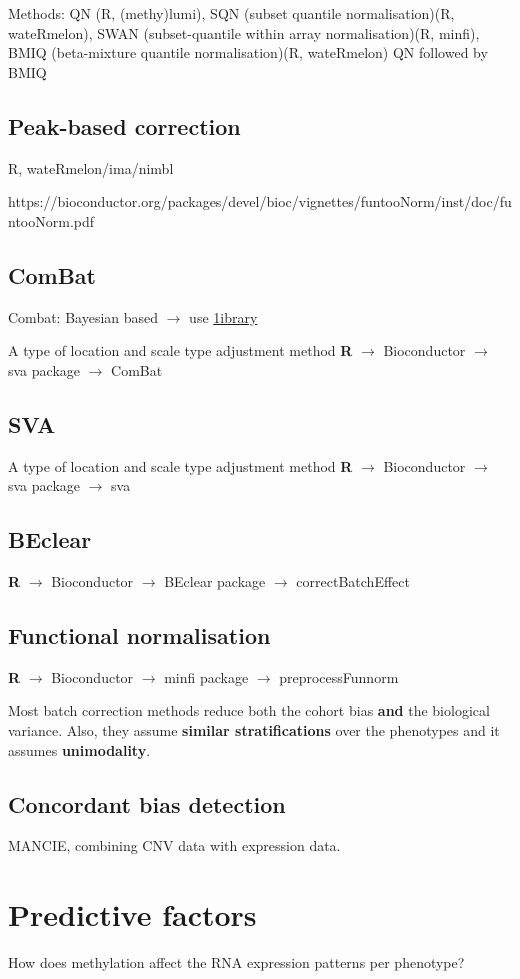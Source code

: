 \documentclass[a4paper,10pt]{article}
\begin{document}
Methods: 
QN  (R, (methy)lumi), 
SQN (subset quantile normalisation)(R, wateRmelon), 
SWAN (subset-quantile within array normalisation)(R, minfi),
BMIQ (beta-mixture quantile normalisation)(R, wateRmelon)
QN followed by BMIQ
\subsection{Peak-based correction}
%
R, wateRmelon/ima/nimbl

https://bioconductor.org/packages/devel/bioc/vignettes/funtooNorm/inst/doc/funtooNorm.pdf

\subsection{ComBat}
%
Combat: Bayesian based $\rightarrow$ use \href{http://www.bu.edu/jlab/wp-assets/ComBat/Abstract.html}{1ibrary} 

A type of location and scale type adjustment method
\textbf{R} $\rightarrow$ Bioconductor $\rightarrow$ sva package $\rightarrow$ ComBat

\subsection{SVA}
%
A type of location and scale type adjustment method
\textbf{R} $\rightarrow$ Bioconductor $\rightarrow$ sva package $\rightarrow$ sva


\subsection{BEclear}

\textbf{R} $\rightarrow$ Bioconductor $\rightarrow$ BEclear package $\rightarrow$ correctBatchEffect

\subsection{Functional normalisation}

\textbf{R} $\rightarrow$ Bioconductor $\rightarrow$ minfi package $\rightarrow$ preprocessFunnorm

Most batch correction methods reduce both the cohort bias \textbf{and} the biological variance.
Also, they assume \textbf{similar stratifications} over the phenotypes and it assumes \textbf{unimodality}.

\subsection{Concordant bias detection}
MANCIE, combining CNV data with expression data.

\section{Predictive factors}
%
How does methylation affect the RNA expression patterns per phenotype?






\end{document}
